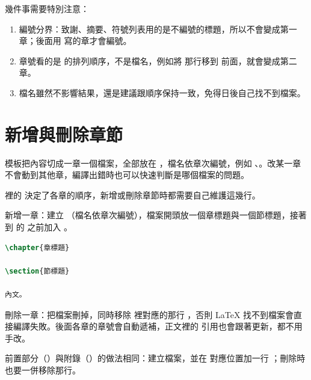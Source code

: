 幾件事需要特別注意：

\begin{enumerate}
\item 編號分界：致謝、摘要、符號列表用的是不編號的標題，所以不會變成第一章；後面用 \code{\chapter} 寫的章才會編號。
\item 章號看的是 \code{} 的排列順序，不是檔名，例如將  那行移到  前面，就會變成第二章。
\item 檔名雖然不影響結果，還是建議跟順序保持一致，免得日後自己找不到檔案。
\end{enumerate}

\section{新增與刪除章節}

模板把內容切成一章一個檔案，全部放在 ，檔名依章次編號，例如 、。改某一章不會動到其他章，編譯出錯時也可以快速判斷是哪個檔案的問題。

 裡的 \code{} 決定了各章的順序，新增或刪除章節時都需要自己維護這幾行。

新增一章：建立 （檔名依章次編號），檔案開頭放一個章標題與一個節標題，接著到  的  之前加入 \code{}。

\begin{lstlisting}[language=latex]
\chapter{章標題}

\section{節標題}

內文。
\end{lstlisting}

刪除一章：把檔案刪掉，同時移除  裡對應的那行 \code{}，否則 \LaTeX{} 找不到檔案會直接編譯失敗。後面各章的章號會自動遞補，正文裡的 \code{\ref} 引用也會跟著更新，都不用手改。

前置部分（）與附錄（）的做法相同：建立檔案，並在  對應位置加一行 \code{}；刪除時也要一併移除那行。

